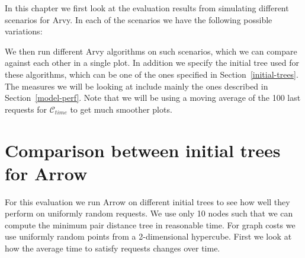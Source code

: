 \documentclass[a4paper, oneside]{discothesis}
\begin{document}
In this chapter we first look at the evaluation results from simulating different scenarios for Arvy. In each of the scenarios we have the following possible variations:

We then run different Arvy algorithms on such scenarios, which we can compare against each other in a single plot. In addition we specify the initial tree used for these algorithms, which can be one of the ones specified in Section~\ref{initial-trees}. The measures we will be looking at include mainly the ones described in Section~\ref{model-perf}. Note that we will be using a moving average of the 100 last requests for $\mathcal{C}_{time}$ to get much smoother plots.



\section{Comparison between initial trees for Arrow}

For this evaluation we run Arrow on different initial trees to see how well they perform on uniformly random requests. We use only 10 nodes such that we can compute the minimum pair distance tree in reasonable time. For graph costs we use uniformly random points from a 2-dimensional hypercube. First we look at how the average time to satisfy requests changes over time.

\end{document}
